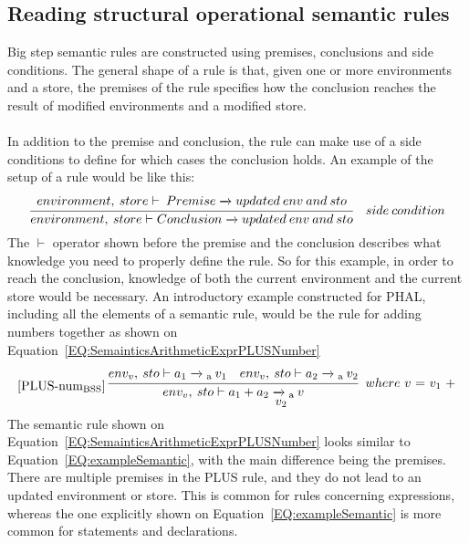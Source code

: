 \subsection{Reading structural operational semantic rules}
Big step semantic rules are constructed using premises, conclusions and side conditions. 
The general shape of a rule is that, given one or more environments and a store, the premises of the rule specifies how the conclusion reaches the result of modified environments and a modified store.
\\\\
In addition to the premise and conclusion, the rule can make use of a side conditions to define for which cases the conclusion holds. An example of the setup of a rule would be like this:
\begin{equation}\label{EQ:exampleSemantic}
\cfrac
{
    environment, \: store \vdash \: Premise \xrightarrow{} updated \: env \: and \: sto
}
{ 
    environment, \: store \vdash Conclusion \xrightarrow{} updated \: env \: and \: sto
}
\quad side \: condition
\end{equation}
The $\vdash$ operator shown before the premise and the conclusion describes what knowledge you need to properly define the rule. 
So for this example, in order to reach the conclusion, knowledge of both the current environment and the current store would be necessary. 
An introductory example constructed for PHAL, including all the elements of a semantic rule, would be the rule for adding numbers together as shown on Equation~\ref{EQ:SemainticsArithmeticExprPLUSNumber}
\begin{equation}\label{EQ:SemainticsArithmeticExprPLUSNumber}
\begin{minipage}{.2\linewidth}
$[\text{PLUS-num}_\text{BSS}]$
\end{minipage}
\begin{minipage}{.8\linewidth}
\centering
$\cfrac{env_v, \: sto \vdash a_1 \xrightarrow{}\textsubscript{a} \: v_1 \quad env_v, \: sto \vdash a_2 \xrightarrow{}\textsubscript{a} \: v_2}{env_v, \: sto \vdash a_1 + a_2 \xrightarrow{}\textsubscript{a} \: v}$
$ \: where$ $v$ $=$ $v_1$ $+$ $v_2$
\end{minipage}
\end{equation}
The semantic rule shown on Equation~\ref{EQ:SemainticsArithmeticExprPLUSNumber} looks similar to Equation~\ref{EQ:exampleSemantic}, with the main difference being the premises. 
There are multiple premises in the PLUS rule, and they do not lead to an updated environment or store. 
This is common for rules concerning expressions, whereas the one explicitly shown on Equation~\ref{EQ:exampleSemantic} is more common for statements and declarations. 
